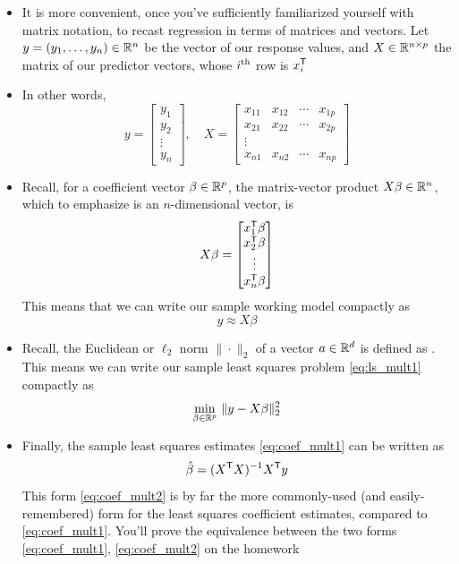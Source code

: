 \documentclass{article}
\begin{document}
\begin{itemize}
\item It is more convenient, once you've sufficiently familiarized yourself with
  matrix notation, to recast regression in terms of matrices and vectors. Let $y 
  = (y_1, \dots, y_n) \in \mathbb{R}^n$ be the vector of our response values, and $X \in
  \mathbb{R}^{n \times p}$ the matrix of our predictor vectors, whose $i^{\textnormal{th}}$ row is
  $x_i^{\mathsf{T}}$    

\item In other words,
  \[
  y = \begin{bmatrix} 
    y_1 \\ y_2 \\ \vdots \\ y_n 
  \end{bmatrix}, \quad 
  X = \begin{bmatrix} 
    x_{11} & x_{12} & \cdots & x_{1p} \\
    x_{21} & x_{22} & \cdots & x_{2p} \\
    \vdots & & & \\
    x_{n1} & x_{n2} & \cdots & x_{np} 
    \end{bmatrix}
  \]

\item Recall, for a coefficient vector $\beta \in \mathbb{R}^p$, the matrix-vector
  product $X \beta \in \mathbb{R}^n$, which to emphasize is an $n$-dimensional vector,
  is    
  \[
  X \beta = 
  \begin{bmatrix} 
    x_1^{\mathsf{T}} \beta \\ x_2^{\mathsf{T}} \beta \\ \vdots \\ x_n^{\mathsf{T}} \beta 
  \end{bmatrix}
  \]
  This means that we can write our sample working model compactly as
  \[
  y \approx X \beta
  \]

\item Recall, the Euclidean or $\ell_2$ norm $\|\cdot\|_2$ of a vector $a \in
  \mathbb{R}^d$ is defined as . This means we
  can write our sample least squares problem \eqref{eq:ls_mult1} compactly as  
  \begin{equation}
  \label{eq:ls_mult2}
  \min_{\beta \in \mathbb{R}^p} \, \|y - X \beta\|_2^2
  \end{equation}

\item Finally, the sample least squares estimates \eqref{eq:coef_mult1} can 
  be written as 
  \begin{equation}
  \label{eq:coef_mult2}
  \hat{\beta} = (X^{\mathsf{T}} X)^{-1} X^{\mathsf{T}} y  
  \end{equation}
  This form \eqref{eq:coef_mult2} is by far the more commonly-used (and
  easily-remembered) form for the least squares coefficient estimates, compared
  to \eqref{eq:coef_mult1}. You'll prove the equivalence between the two
  forms \eqref{eq:coef_mult1}, \eqref{eq:coef_mult2} on the homework 


\end{itemize}
\end{document}
